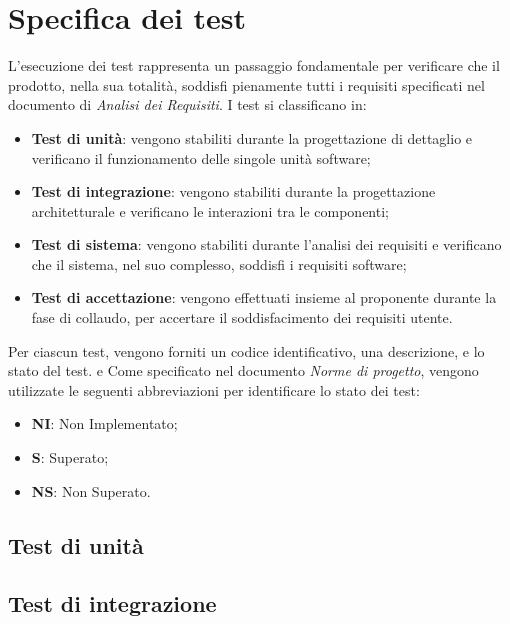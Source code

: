 \section{Specifica dei test}
L'esecuzione dei test rappresenta un passaggio fondamentale per verificare che 
il prodotto, nella sua totalità, soddisfi pienamente tutti i requisiti specificati
nel documento di \textit{Analisi dei Requisiti}.
I test si classificano in:
\begin{itemize}
    \item \textbf{Test di unità}: vengono stabiliti durante la progettazione di
    dettaglio e verificano il funzionamento delle singole unità software;
    \item \textbf{Test di integrazione}: vengono stabiliti durante la progettazione
    architetturale e verificano le interazioni tra le componenti;
    \item \textbf{Test di sistema}: vengono stabiliti durante l'analisi dei requisiti
    e verificano che il sistema, nel suo complesso, soddisfi i requisiti software;
    \item \textbf{Test di accettazione}: vengono effettuati insieme al proponente 
    durante la fase di collaudo, per accertare il soddisfacimento dei requisiti utente.
\end{itemize}
Per ciascun test, vengono forniti un codice identificativo, una descrizione, e
lo stato del test.  e
Come specificato nel documento \textit{Norme di progetto}, vengono utilizzate le seguenti 
abbreviazioni per identificare lo stato dei test:
\begin{itemize}
    \item \textbf{NI}: Non Implementato;
    \item \textbf{S}: Superato;
    \item \textbf{NS}: Non Superato.
\end{itemize}


\subsection{Test di unità}
\subsection{Test di integrazione}
